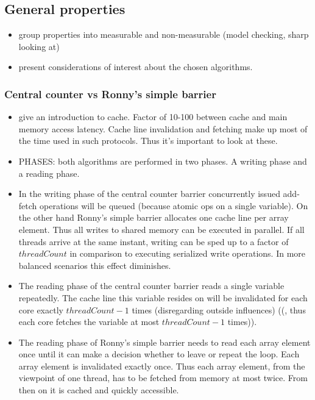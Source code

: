 \documentclass[a4paper, 10pt]{article}
\begin{document}
\begin{enumerate}
\subsection{General properties}
\label{ssec:analysis-general}
\begin{itemize}
	\item group properties into measurable and non-measurable (model checking, sharp looking at)
	\item present considerations of interest about the chosen algorithms.
\end{itemize}

\subsubsection{Central counter vs Ronny's simple barrier}
\label{sssec:analysis-general-shared}
\begin{itemize}
	\item give an introduction to cache. Factor of 10-100 between cache and main memory access latency. Cache line invalidation and fetching make up most of the time used in such protocols. Thus it's important to look at these.
	\item PHASES: both algorithms are performed in two phases. A writing phase and a reading phase.
	\item In the writing phase of the central counter barrier concurrently issued add-fetch operations will be queued (because atomic ops on a single variable). On the other hand Ronny's simple barrier allocates one cache line per array element. Thus all writes to shared memory can be executed in parallel. If all threads arrive at the same instant, writing can be sped up to a factor of $\mathit{threadCount}$ in comparison to executing serialized write operations. In more balanced scenarios this effect diminishes.
	\item The reading phase of the central counter barrier reads a single variable repeatedly. The cache line this variable resides on will be invalidated for each core exactly $\mathit{threadCount} - 1$ times (disregarding outside influences) ((, thus each core fetches the variable at most $\mathit{threadCount} - 1$ times)).
	\item The reading phase of Ronny's simple barrier needs to read each array element once until it can make a decision whether to leave or repeat the loop. Each array element is invalidated exactly once. Thus each array element, from the viewpoint of one thread, has to be fetched from memory at most twice. From then on it is cached and quickly accessible.

\end{itemize}
\end{enumerate}
\end{document}
